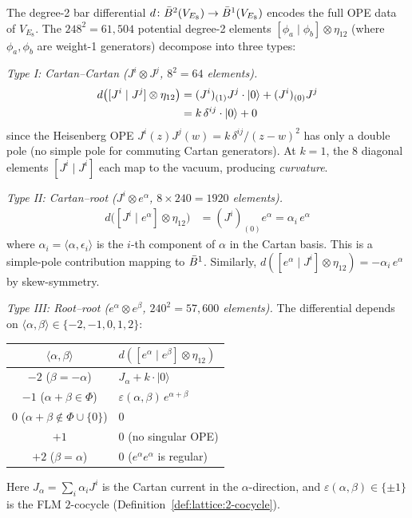 \begin{computation}
\label{comp:E8-bar-deg2}
The degree-2 bar differential $d\colon \bar{B}^2(V_{E_8}) \to \bar{B}^1(V_{E_8})$
encodes the full OPE data of $V_{E_8}$.  The $248^2 = 61{,}504$
potential degree-2 elements $[\phi_a \mid \phi_b] \otimes \eta_{12}$
(where $\phi_a, \phi_b$ are weight-1 generators) decompose into
three types:

\emph{Type I: Cartan--Cartan ($J^i \otimes J^j$, $8^2 = 64$ elements).}
\begin{align}
d\bigl([J^i \mid J^j] \otimes \eta_{12}\bigr)
&= (J^i)_{(1)}J^j \cdot |0\rangle + (J^i)_{(0)}J^j \notag \\
&= k\,\delta^{ij} \cdot |0\rangle + 0
\label{eq:E8-cartan-cartan}
\end{align}
since the Heisenberg OPE $J^i(z) J^j(w) = k\,\delta^{ij}/(z-w)^2$
has only a double pole (no simple pole for commuting Cartan generators).
At $k = 1$, the $8$ diagonal elements $[J^i \mid J^i]$ each
map to the vacuum, producing \emph{curvature}.

\emph{Type II: Cartan--root ($J^i \otimes e^\alpha$, $8 \times 240 = 1920$ elements).}
\begin{align}
d\bigl([J^i \mid e^\alpha] \otimes \eta_{12}\bigr)
&= (J^i)_{(0)}e^\alpha = \alpha_i \, e^\alpha
\label{eq:E8-cartan-root}
\end{align}
where $\alpha_i = \langle \alpha, \epsilon_i \rangle$ is the $i$-th
component of $\alpha$ in the Cartan basis.  This is a simple-pole
contribution mapping to $\bar{B}^1$.  Similarly,
$d([e^\alpha \mid J^i] \otimes \eta_{12}) = -\alpha_i\, e^\alpha$
by skew-symmetry.

\emph{Type III: Root--root ($e^\alpha \otimes e^\beta$,
$240^2 = 57{,}600$ elements).}
The differential depends on
$\langle \alpha, \beta \rangle \in \{-2, -1, 0, 1, 2\}$:
\begin{center}
\renewcommand{\arraystretch}{1.2}
\begin{tabular}{cl}
$\langle \alpha, \beta \rangle$ & $d([e^\alpha \mid e^\beta] \otimes \eta_{12})$ \\
\hline
$-2$ \;($\beta = -\alpha$) &
  $J_\alpha + k \cdot |0\rangle$ \\
$-1$ \;($\alpha + \beta \in \Phi$) &
  $\varepsilon(\alpha,\beta)\, e^{\alpha+\beta}$ \\
$0$ \;($\alpha + \beta \notin \Phi \cup \{0\}$) & $0$ \\
$+1$ & $0$ \;(no singular OPE) \\
$+2$ \;($\beta = \alpha$) & $0$ \;($e^\alpha e^\alpha$ is regular)
\end{tabular}
\end{center}
Here $J_\alpha = \sum_i \alpha_i J^i$ is the Cartan current
in the $\alpha$-direction, and $\varepsilon(\alpha,\beta) \in \{\pm 1\}$
is the FLM $2$-cocycle (Definition~\ref{def:lattice:2-cocycle}).


\end{computation}
